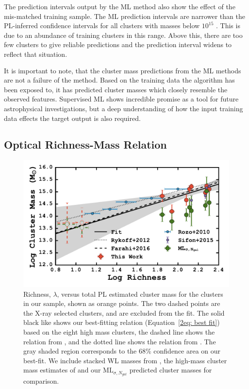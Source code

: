The prediction intervals output by the ML method also show the effect of the mis-matched training sample. The ML prediction intervals are narrower than the PL-inferred confidence intervals for all clusters with masses below $10^{15}$ \Msol. This is due to an abundance of training clusters in this range. Above this, there are too few clusters to give reliable predictions and the prediction interval widens to reflect that situation.

It is important to note, that the cluster mass predictions from the ML methods are not a failure of the method. Based on the training data the algorithm has been exposed to, it has predicted cluster masses which closely resemble the observed features. Supervised ML shows incredible promise as a tool for future astrophysical investigations, but a deep understanding of how the input training data effects the target output is also required.

\subsection{Optical Richness-Mass Relation}
\begin{figure}[t]
	\begin{center}
		\includegraphics[width=\textwidth]{./figures2/massRichness.pdf} 
	\end{center}
	\caption[Richness versus total cluster mass for the clusters in our sample]{Richness, $\lambda$, versus total PL estimated cluster mass for the clusters in our sample, shown as orange points. The two dashed points are the X-ray selected clusters, and are excluded from the fit. The solid black like shows our best-fitting relation (Equation~\protect\ref{2eq: best fit}) based on the eight high mass clusters, the dashed line shows the relation from \protect\cite{Farahi2016}, and the dotted line shows the relation from \protect\cite{Rykoff2012}. The gray shaded region corresponds to the 68\% confidence area on our best-fit. We include stacked WL masses from \protect\cite{Rozo2010}, the high-mass cluster mass estimates of \protect\cite{Sifon2015} and our $\mathrm{ML}_{\sigma, N_{gal}}$ predicted cluster masses for comparison.}
\label{2fig:massRichness} 
\end{figure}

